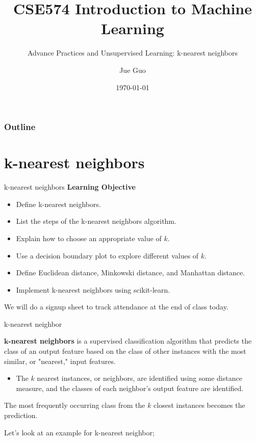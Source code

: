 \documentclass[8pt,dvipsnames]{beamer}
\title{CSE574 Introduction to Machine Learning}
\subtitle{Advance Practices and Unsupervised Learning: k-nearest neighbors}
\author{Jue Guo}
\institute{University at Buffalo}
\date{\today}
\begin{document}
\begin{frame}
	\titlepage
\end{frame}
\begin{frame}
	\frametitle{Outline}
	\tableofcontents
\end{frame}
\section{k-nearest neighbors}
\begin{frame}{k-nearest neighbors}
	\textbf{Learning Objective}
	\begin{itemize}
		\item Define k-nearest neighbors.
		\item List the steps of the k-nearest neighbors algorithm.
		\item Explain how to choose an appropriate value of \(k\).
		\item Use a decision boundary plot to explore different values of \(k\).
		\item Define Euclidean distance, Minkowski distance, and Manhattan distance.
		\item Implement k-nearest neighbors using scikit-learn.
	\end{itemize}
	We will do a signup sheet to track attendance at the end of class today.
\end{frame}

\begin{frame}{k-nearest neighbor}

	\textbf{\(\boldsymbol{k}\)-nearest neighbors} is a supervised classification algorithm that predicts the class of an output feature based on the class of other instances with the most similar, or "nearest," input features.
	\begin{itemize}
		\item  The \(k\) nearest instances, or neighbors, are identified using some distance measure, and the classes of each neighbor's output feature are identified.
	\end{itemize}
	The most frequently occurring class from the \(k\) closest instances becomes the prediction.

	Let's look at an example for k-nearest neighbor;

\end{frame}
\end{document}
